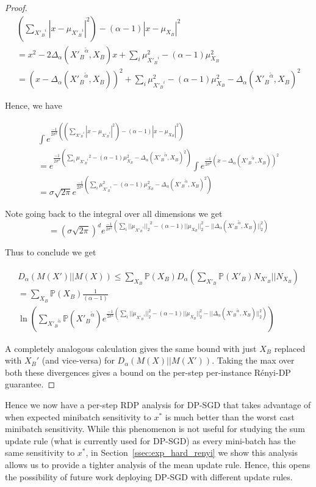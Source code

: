 \begin{proof}
\begin{multline}
    (\sum_{{X'_B}^i}|x- \mu_{{X'_B}^i}|^2) - (\alpha - 1)|x - \mu_{X_B}|^2 \\ = x^2 - 2 \Delta_{\alpha}({X'_B}^{\tilde \alpha},X_B)x + \sum_{i} \mu_{{X'_B}^i}^2 - (\alpha-1) \mu_{X_B}^2 \\ = (x - \Delta_{\alpha}({X'_B}^{\tilde \alpha},X_B))^2 + \sum_{i} \mu_{{X'_B}^i}^2 - (\alpha-1) \mu_{X_B}^2 - \Delta_{\alpha}({X'_B}^{\tilde \alpha},X_B)^2
\end{multline}


Hence, we have 

\begin{multline}
    \int e^{\frac{-1}{2\sigma^2} ( (\sum_{{X'_B}^i}|x- \mu_{{X'_B}^i}|^2) - (\alpha - 1)|x - \mu_{X_B}|^2)} \\ = e^{\frac{-1}{2\sigma^2}(\sum_{i} {\mu_{{X'_B}^i}}^2 - (\alpha-1) \mu_{X_B}^2 - \Delta_{\alpha}({X'_B}^{\tilde \alpha},X_B)^2)} \int e^{\frac{-1}{2\sigma^2} (x - \Delta_{\alpha}({X'_B}^{\tilde \alpha},X_B))^2} \\ = \sigma \sqrt{2 \pi} e^{\frac{-1}{2\sigma^2}(\sum_{i} \mu_{{X'_B}^i}^2 - (\alpha-1) \mu_{X_B}^2 - \Delta_{\alpha}({X'_B}^{\tilde \alpha},X_B)^2)}
\end{multline}


Note going back to the integral over all dimensions we get $$= (\sigma \sqrt{2 \pi})^{d} e^{\frac{-1}{2\sigma^2}(\sum_{i} ||{\mu_{{X'_B}^i}||_2}^2 - (\alpha-1) ||\mu_{X_B}||_2^2 - ||\Delta_{\alpha}({X'_B}^{\tilde \alpha},X_B)||_2^2)}$$

Thus to conclude we get 

\begin{multline}
    D_{\alpha}(M(X') || M(X))  \leq \sum_{X_B} \mathbb{P}(X_B) D_{\alpha}(\sum_{X'_B} \mathbb{P}(X'_B) N_{X'_B} || N_{X_B}) \\ = \sum_{X_B} \mathbb{P}(X_B) \frac{1}{(\alpha-1)} \\ \ln (\sum_{{X'_B}^{\tilde \alpha}} \mathbb{P}({X'_B}^{\tilde \alpha}) e^{\frac{-1}{2\sigma^2}(\sum_{i} ||\mu_{{X'_B}^i}||_2^2 - (\alpha-1) ||\mu_{X_B}||_2^2 - ||\Delta_{\alpha}({X'_B}^{\tilde \alpha},X_B)||_2^2)})
\end{multline}

A completely analogous calculation gives the same bound with just $X_B$ replaced with $X_B'$ (and vice-versa) for $D_{\alpha}(M(X)||M(X'))$. Taking the max over both these divergences gives a bound on the per-step per-instance R\'enyi-DP guarantee.

\end{proof}


Hence we now have a per-step RDP analysis for DP-SGD that takes advantage of when expected minibatch sensitivity to $x^*$ is much better than the worst cast minibatch sensitivity. While this phenomenon is not useful for studying the sum update rule (what is currently used for DP-SGD) as every mini-batch has the same sensitivity to $x^*$, in Section~\ref{ssec:exp_hard_renyi} we show this analysis allows us to provide a tighter analysis of the mean update rule. Hence, this opens the possibility of future work deploying DP-SGD with different update rules.
